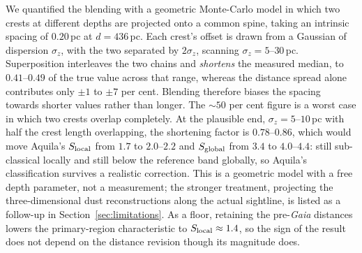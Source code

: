 \documentclass[usenatbib,twoside,twocolumn]{mnras}
\begin{document}
We quantified the blending with a geometric Monte-Carlo model in which two crests at different depths are projected onto a common spine, taking an intrinsic spacing of $0.20$\,pc at $d=436$\,pc. Each crest's offset is drawn from a Gaussian of dispersion $\sigma_z$, with the two separated by $2\sigma_z$, scanning $\sigma_z=5$--$30$\,pc. Superposition interleaves the two chains and \emph{shortens} the measured median, to $0.41$--$0.49$ of the true value across that range, whereas the distance spread alone contributes only $\pm1$ to $\pm7$ per cent. Blending therefore biases the spacing towards shorter values rather than longer. The $\sim50$ per cent figure is a worst case in which two crests overlap completely. At the plausible end, $\sigma_z=5$--$10$\,pc with half the crest length overlapping, the shortening factor is $0.78$--$0.86$, which would move Aquila's $S_{\rm local}$ from $1.7$ to $2.0$--$2.2$ and $S_{\rm global}$ from $3.4$ to $4.0$--$4.4$: still sub-classical locally and still below the reference band globally, so Aquila's classification survives a realistic correction. This is a geometric model with a free depth parameter, not a measurement; the stronger treatment, projecting the three-dimensional dust reconstructions along the actual sightline, is listed as a follow-up in Section~\ref{sec:limitations}. As a floor, retaining the pre-\textit{Gaia} distances lowers the primary-region characteristic to $S_{\rm local}\approx1.4$, so the sign of the result does not depend on the distance revision though its magnitude does.
\end{document}
